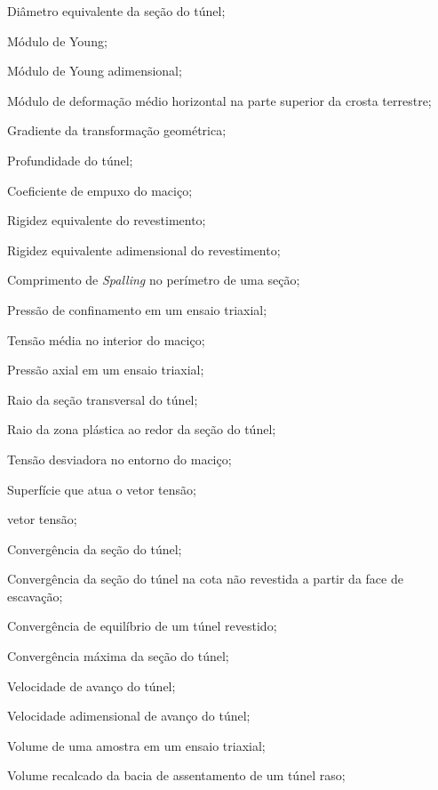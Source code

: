\item[$D$]				Diâmetro equivalente da seção do túnel;
\item[$E$]				Módulo de Young;
\item[$E^*$]			Módulo de Young adimensional;
\item[$E_h$]			Módulo de deformação médio horizontal na parte superior da crosta terrestre;
\item[$\Fll$]			Gradiente da transformação geométrica;
\item[$H$]				Profundidade do túnel;
\item[$K$]				Coeficiente de empuxo do maciço;
\item[$K_r$]			Rigidez equivalente do revestimento;
\item[$K_r^*$]			Rigidez equivalente adimensional do revestimento;
\item[$L_s$]			Comprimento de \textit{Spalling} no perímetro de uma seção;
\item[$ P $] 			Pressão de confinamento em um ensaio triaxial;
\item[$ P_0 $] 			Tensão média no interior do maciço;
\item[$ Q $] 			Pressão axial em um ensaio triaxial;
\item[$ R $]			Raio da seção transversal do túnel;
\item[$ R^p $]			Raio da zona plástica ao redor da seção do túnel;
\item[$ S_0 $] 			Tensão desviadora no entorno do maciço;
\item[$ S $] 			Superfície que atua o vetor tensão;
\item[$ \Tl $] 			vetor tensão;
\item[$ U $] 			Convergência da seção do túnel;
\item[$ U_{0} $] 		Convergência da seção do túnel na cota não revestida a partir da face de escavação;
\item[$ U_{eq} $] 		Convergência de equilíbrio de um túnel revestido;
\item[$ U_{max} $] 		Convergência máxima da seção do túnel;
\item[$ V $] 			Velocidade de avanço do túnel;
\item[$ V^* $] 			Velocidade adimensional de avanço do túnel;
\item[$ V_a $] 			Volume de uma amostra em um ensaio triaxial;
\item[$ V_{bacia} $]	Volume recalcado da bacia de assentamento de um túnel raso;

